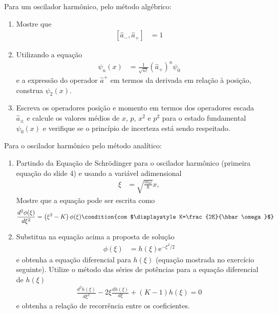 \begin{prob}
	Para um oscilador harmônico, pelo método algébrico:
	\begin{enumerate}[label=\alph *)]
			\item Mostre que
				\begin{align}
					\left[\hat{a}_{-},\hat{a}_{+}\right] &= 1
				\end{align}
			\item Utilizando a equação
				\begin{align}
					\psi_n(x) &= \frac{1}{\sqrt{n!}}\left(\hat{a}_{+}\right)^{n}\psi_{0}
				\end{align}
				e a expressão do operador $\hat{a}^{+}$ em termos da derivada em relação à posição, construa $\psi_{2}(x)$.
			\item Escreva os operadores posição e momento em termos dos operadores escada $\hat{a}_{\pm}$ e calcule os valores médios de $x$, $p$, $x^{2}$ e $p^{2}$ para o estado fundamental $\psi_{0}(x)$ e verifique se o princípio de incerteza está sendo respeitado.
	\end{enumerate}
		\begin{sol}
				
		\end{sol}
\end{prob}
\begin{prob}
	Para o oscilador harmônico pelo método analítico:
	\begin{enumerate}[label=\alph *)]
			\item Partindo da Equação de Schrödinger para o oscilador harmônico (primeira equação do slide 4) e usando a variável adimensional
				\begin{align}
					\xi &= \sqrt{\frac{m \omega}{\hbar}}x,
				\end{align}
				Mostre que a equação pode ser escrita como
				\begin{dmath*}
					\frac{d^{2} \phi(\xi)}{d \xi^{2}} = \left(\xi^{2}-K\right) \phi(\xi)\condition{com $\displaystyle K=\frac{2E}{\hbar \omega}$}
				\end{dmath*}
			\item Substitua na equação acima a proposta de solução
				\begin{align}
					\phi(\xi) &= h(\xi)\mathrm{e}^{-\xi^{2}/2}
				\end{align}
				e obtenha a equação diferencial para $h(\xi)$ (equação mostrada no exercício seguinte).
				Utilize o método das séries de potências para a equação diferencial de $h(\xi)$
				\begin{align}
						\frac{d^{2}h(\xi)}{d \xi^{2}}-2 \xi \frac{dh(\xi)}{d \xi}+\left(K-1\right)h(\xi)=0
				\end{align}
				e obtenha a relação de recorrência entre os coeficientes.
	\end{enumerate}
		\begin{sol}
				
		\end{sol}
\end{prob}

